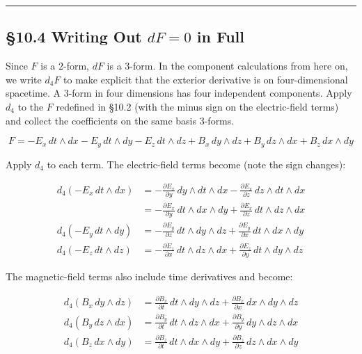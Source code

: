 \begin{center}\rule{0.5\linewidth}{0.5pt}\end{center}

\hypertarget{writing-out-df0-in-full}{%
\subsection{\texorpdfstring{§10.4 Writing Out \(dF=0\) in
Full}{§10.4 Writing Out dF=0 in Full}}\label{writing-out-df0-in-full}}

Since \(F\) is a \(2\)-form, \(dF\) is a \(3\)-form. In the component
calculations from here on, we write \(d_4F\) to make explicit that the
exterior derivative is on four-dimensional spacetime. A \(3\)-form in
four dimensions has four independent components. Apply \(d_4\) to the
\(F\) redefined in §10.2 (with the minus sign on the electric-field
terms) and collect the coefficients on the same basis \(3\)-forms.

\[F = -E_x\,dt\wedge dx - E_y\,dt\wedge dy - E_z\,dt\wedge dz + B_x\,dy\wedge dz + B_y\,dz\wedge dx + B_z\,dx\wedge dy\]

Apply \(d_4\) to each term. The electric-field terms become (note the
sign changes):

\[\begin{aligned}
d_4\!\left(-E_x\,dt\wedge dx\right) &= -\frac{\partial E_x}{\partial y}\,dy\wedge dt\wedge dx - \frac{\partial E_x}{\partial z}\,dz\wedge dt\wedge dx \\
&= -\frac{\partial E_x}{\partial y}\,dt\wedge dx\wedge dy + \frac{\partial E_x}{\partial z}\,dt\wedge dz\wedge dx \\
d_4\!\left(-E_y\,dt\wedge dy\right) &= -\frac{\partial E_y}{\partial z}\,dt\wedge dy\wedge dz + \frac{\partial E_y}{\partial x}\,dt\wedge dx\wedge dy \\
d_4\!\left(-E_z\,dt\wedge dz\right) &= -\frac{\partial E_z}{\partial x}\,dt\wedge dz\wedge dx + \frac{\partial E_z}{\partial y}\,dt\wedge dy\wedge dz
\end{aligned}\]

The magnetic-field terms also include time derivatives and become:

\[\begin{aligned}
d_4(B_x\,dy\wedge dz) &= \frac{\partial B_x}{\partial t}\,dt\wedge dy\wedge dz + \frac{\partial B_x}{\partial x}\,dx\wedge dy\wedge dz \\
d_4(B_y\,dz\wedge dx) &= \frac{\partial B_y}{\partial t}\,dt\wedge dz\wedge dx + \frac{\partial B_y}{\partial y}\,dy\wedge dz\wedge dx \\
d_4(B_z\,dx\wedge dy) &= \frac{\partial B_z}{\partial t}\,dt\wedge dx\wedge dy + \frac{\partial B_z}{\partial z}\,dz\wedge dx\wedge dy
\end{aligned}\]

